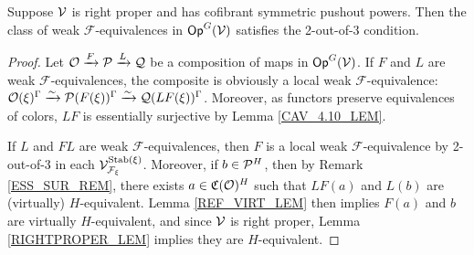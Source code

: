 \documentclass[a4paper,10pt
]{article}%
\renewcommand{\F}{\mathcal F}
\newcommand{\J}{\mathbb J}
\newcommand{\Q}{\mathcal Q}
\renewcommand{\1}{\ensuremath{\mathbb{id}}}
\begin{document}
\begin{proposition}
      \label{CAV_4.15_PROP}
      \label{2OUTOF3_PROP}
      Suppose $\V$ is right proper and has cofibrant symmetric pushout powers.
      Then the class of weak $\F$-equivalences in $\mathsf{Op}^G(\V)$ satisfies the 2-out-of-3 condition.
\end{proposition}
\begin{proof}
      Let $\O \xrightarrow{F} \P \xrightarrow{L} \Q$ be a composition of maps in $\mathsf{Op}^G(\V)$.
      If $F$ and $L$ are weak $\F$-equivalences,
      the composite is obviously a local weak $\F$-equivalence:
      $\O(\ksi)^\Gamma \xrightarrow{\sim} \P(F(\ksi))^\Gamma \xrightarrow{\sim} \Q(LF(\ksi))^\Gamma$.
      Moreover, as functors preserve equivalences of colors, $L F$ is essentially surjective by Lemma \ref{CAV_4.10_LEM}. 
      
      If $L$ and $FL$ are weak $\F$-equivalences,
      then $F$ is a local weak $\F$-equivalence by 2-out-of-3 in each $\V^{\Stab(\ksi)}_{\F_\ksi}$.
      Moreover, if $b \in \P^H$, then by Remark \ref{ESS_SUR_REM}, there exists $a \in \mathfrak C(\O)^H$ such that
      $LF(a)$ and $L(b)$ are (virtually) $H$-equivalent.
      Lemma \ref{REF_VIRT_LEM} then implies $F(a)$ and $b$ are virtually $H$-equivalent, 
      and since $\V$ is right proper, Lemma \ref{RIGHTPROPER_LEM} implies they are $H$-equivalent.


\end{proof}
\end{document}
